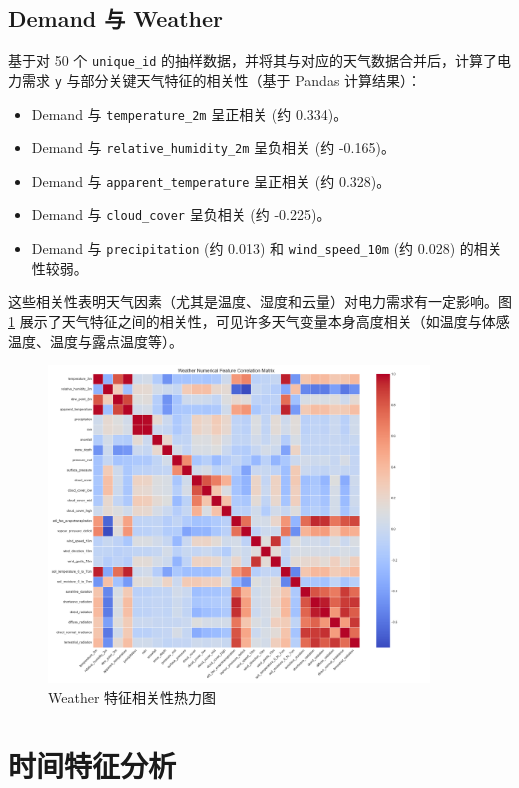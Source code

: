 \documentclass{article} %
\begin{document}
\subsection{Demand 与 Weather}
\label{subsec:demand_weather}
基于对 50 个 \texttt{unique\_id} 的抽样数据，并将其与对应的天气数据合并后，计算了电力需求 \texttt{y} 与部分关键天气特征的相关性（基于 Pandas 计算结果）：
\begin{itemize}
    \item Demand 与 \texttt{temperature\_2m} 呈正相关 (约 0.334)。
    \item Demand 与 \texttt{relative\_humidity\_2m} 呈负相关 (约 -0.165)。
    \item Demand 与 \texttt{apparent\_temperature} 呈正相关 (约 0.328)。
    \item Demand 与 \texttt{cloud\_cover} 呈负相关 (约 -0.225)。
    \item Demand 与 \texttt{precipitation} (约 0.013) 和 \texttt{wind\_speed\_10m} (约 0.028) 的相关性较弱。
\end{itemize}
这些相关性表明天气因素（尤其是温度、湿度和云量）对电力需求有一定影响。图 \ref{fig:weather_correlation} 展示了天气特征之间的相关性，可见许多天气变量本身高度相关（如温度与体感温度、温度与露点温度等）。

\begin{figure}[H]
    \centering
    \includegraphics[width=0.9\textwidth]{../plots/weather_correlation_matrix.png}
    \caption{Weather 特征相关性热力图}
    \label{fig:weather_correlation}
\end{figure}

\section{时间特征分析}
\label{sec:time_analysis}
\end{document}
